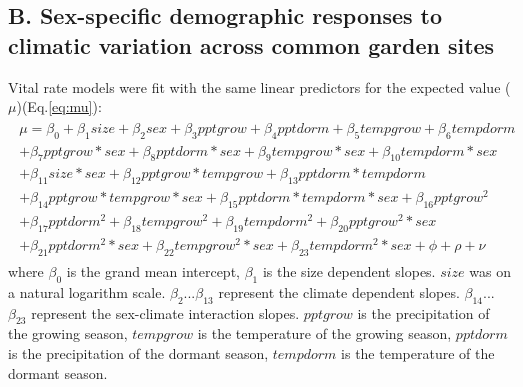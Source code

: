 \documentclass[9pt,twoside,lineno]{pnas-new}
\begin{document}
\subsection*{B. Sex-specific demographic responses to climatic variation across common garden sites}
Vital rate models were fit with the same linear predictors for the expected value ($\mu$)(Eq.\ref{eq:mu}):
\begin{align}\label{eq:mu}
\begin{split}
\mu = \beta_{0} + \beta_{1}size + \beta_{2}sex + \beta_{3}pptgrow + \beta_{4}pptdorm + \beta_{5}tempgrow + \beta_{6}tempdorm \\ 
+ \beta_{7}pptgrow*sex + \beta_{8}pptdorm*sex + \beta_{9}tempgrow*sex + \beta_{10}tempdorm*sex  \\ 
+  \beta_{11}size*sex + \beta_{12}pptgrow*tempgrow + \beta_{13}pptdorm*tempdorm\\
+ \beta_{14}pptgrow*tempgrow*sex + \beta_{15}pptdorm*tempdorm*sex + \beta_{16}pptgrow^2\\
+ \beta_{17}pptdorm^2 + \beta_{18}tempgrow^2 + \beta_{19}tempdorm^2 + \beta_{20}pptgrow^2*sex  \\
+ \beta_{21}pptdorm^2*sex + \beta_{22}tempgrow^2*sex + \beta_{23}tempdorm^2*sex + \phi + \rho + \nu 
\end{split}
\end{align}
\noindent where $\beta_{0}$ is the  grand mean intercept, $\beta_{1}$ is the size dependent slopes.
$size$ was on a natural logarithm scale. 
$\beta_{2}$...$\beta_{13}$ represent the climate dependent slopes.
$\beta_{14}$...$\beta_{23}$ represent the sex-climate interaction slopes.
$pptgrow$ is the precipitation of the growing season, $tempgrow$ is the temperature of the growing season, $pptdorm$ is the precipitation of the dormant season, $tempdorm$ is the temperature of the dormant season.
\end{document}
